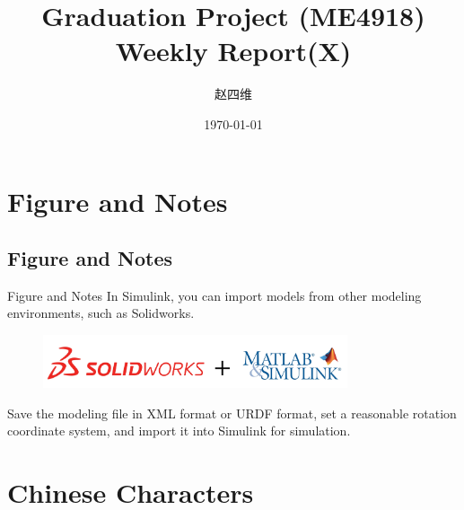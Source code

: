 \documentclass[xcolor=x11names,compress,aspectratio=169]{ctexbeamer}
\title{ Graduation Project  (ME4918)\\
  \textbf{Weekly Report(X)}}
\author{\selectfont\kaishu 赵四维}
\institute
{
   Institute of Robotics,\\
   School of Mechanical Engineering,SJTU 
}
\date{\mydate\today}
\begin{document}
\maketitle


\section{Figure and Notes}
\subsection{Figure and Notes}

\begin{frame}{Figure and Notes}
In Simulink, you can import models from other modeling environments, such as Solidworks.
\begin{figure}
\includegraphics[width=0.8\textwidth]{Figure/logo.png}
\end{figure}

Save the modeling file in XML format or URDF format, set a reasonable rotation coordinate system, and import it into Simulink for simulation.
\end{frame}

\section{Chinese Characters}
\end{document}
